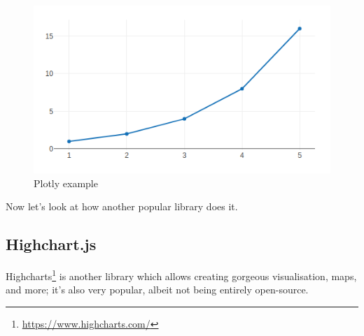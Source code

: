 \documentclass[
]{krantz}
\renewcommand{\href}[2]{#2\footnote{\url{#1}}}
\begin{document}
\begin{figure}[t]

{\centering \includegraphics[width=1\linewidth]{images/candidate-plotly} 

}

\caption{Plotly example}\label{fig:candidate-plotly}
\end{figure}

Now let's look at how another popular library does it.

\hypertarget{widgets-basics-candidates-highcharts}{%
\subsection{Highchart.js}\label{widgets-basics-candidates-highcharts}}

\href{https://www.highcharts.com/}{Highcharts} is another library which allows creating gorgeous visualisation, maps, and more; it's also very popular, albeit not being entirely open-source.
\end{document}
